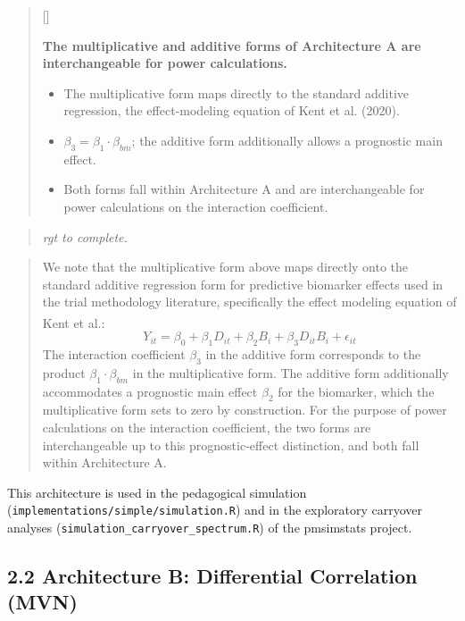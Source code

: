 \documentclass[
  11pt,
]{article}
\newcounter{pgraph}
\newenvironment{bullets}{%
  \stepcounter{pgraph}%
  \begin{quote}\small\sffamily\color[gray]{0.30}%
  {\normalfont\scriptsize\color[gray]{0.58}[\thepgraph]\enspace}}{%
  \end{quote}}
\newenvironment{rgt}{%
  \begin{quote}\small\itshape\color[RGB]{20,60,160}}{%
  \end{quote}}
\newenvironment{orig}{%
  \begin{quote}\normalsize\color[gray]{0.55}}{%
  \end{quote}}
\begin{document}
\begin{bullets}

\textbf{The multiplicative and additive forms of Architecture A
are interchangeable for power calculations.}

\begin{itemize}\setlength{\itemsep}{2pt}\setlength{\parskip}{0pt}
\item The multiplicative form maps directly to the standard
  additive regression, the effect-modeling equation of
  Kent et al. (2020).
\item $\beta_3 = \beta_1 \cdot \beta_{bm}$; the additive form
  additionally allows a prognostic main effect.
\item Both forms fall within Architecture A and are
  interchangeable for power calculations on the interaction
  coefficient.
\end{itemize}

\end{bullets}

\begin{rgt}
rgt to complete.

\end{rgt}

\begin{orig}
We note that the multiplicative form above maps directly onto the
standard additive regression form for predictive biomarker effects used
in the trial methodology literature, specifically the effect modeling
equation of Kent et al.\textsuperscript{}:
\[Y_{it} = \beta_0 + \beta_1 D_{it} + \beta_2 B_i + \beta_3
D_{it} B_i + \epsilon_{it}\] The interaction coefficient \(\beta_3\) in
the additive form corresponds to the product
\(\beta_1 \cdot \beta_{bm}\) in the multiplicative form. The additive
form additionally accommodates a prognostic main effect \(\beta_2\) for
the biomarker, which the multiplicative form sets to zero by
construction. For the purpose of power calculations on the interaction
coefficient, the two forms are interchangeable up to this
prognostic-effect distinction, and both fall within Architecture A.

\end{orig}

This architecture is used in the pedagogical simulation
(\texttt{implementations/simple/simulation.R}) and in the exploratory
carryover analyses (\texttt{simulation\_carryover\_spectrum.R}) of the
pmsimstats project.

\subsection{2.2 Architecture B: Differential Correlation (MVN)}
\end{document}
